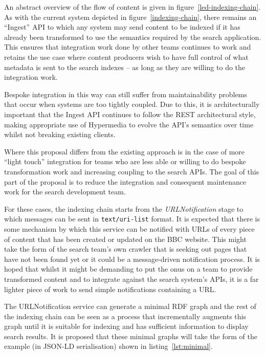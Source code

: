 An abstract overview of the flow of content is given in figure~\ref{led-indexing-chain}.
As with the current system depicted in figure~\ref{indexing-chain},
there remains an ``Ingest'' API to which any system may
send content to be indexed if it has already been transformed to
use the semantics required by the search application. This
ensures that integration work done by other teams continues to work
and retains the use case where content producers wish to have full
control of what metadata is sent to the search indexes -- as long as
they are willing to do the integration work.

Bespoke integration in this way can still suffer from maintainability
problems that occur when systems are too tightly coupled. Due to this,
it is architecturally important that the Ingest API continues to follow
the REST architectural style, making appropriate use of Hypermedia to
evolve the API's semantics over time whilst not breaking existing clients.

Where this proposal differs from the existing approach is in the case
of more ``light touch'' integration for teams who are less able or willing
to do bespoke transformation work and increasing coupling to the search
APIs. The goal of this part of the proposal is to reduce the integration
and consequent maintenance work for the search development team.

For these cases, the indexing chain starts from the \emph{URLNotification}
stage to which messages can be sent in
\texttt{text/uri-list}\cite{amundsen2011hypermedia} format. It is expected
that there is some mechanism by which this service can be notified with URLs
of every piece of content that has been created or updated on the BBC website.
This might take the form of the search team's own crawler that is seeking
out pages that have not been found yet or it could be a message-driven
notification process. It is hoped that whilst it might be demanding to
put the onus on a team
to provide transformed content and to integrate against the search system's
APIs, it is a far lighter piece of work to send simple notifications containing
a URL.

The URLNotification service can generate a minimal RDF graph and the
rest of the indexing chain can be seen as a process that incrementally
augments this graph until it is suitable for indexing and has sufficient
information to display search results. It is proposed that these minimal
graphs will take the form of the example (in JSON-LD serialisation)
shown in listing~\ref{lst:minimal}.

